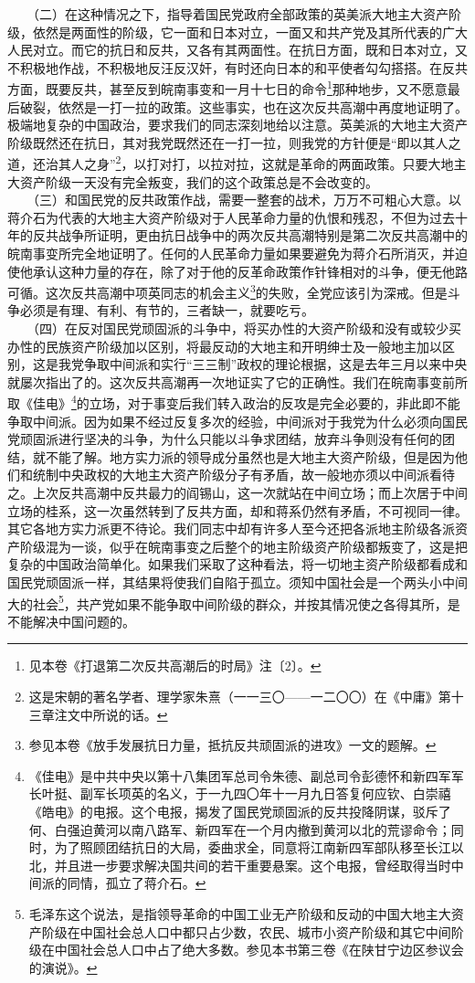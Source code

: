 \documentclass[cn,11pt,chinese]{elegantbook}
\begin{document}
　　（二）在这种情况之下，指导着国民党政府全部政策的英美派大地主大资产阶级，依然是两面性的阶级，它一面和日本对立，一面又和共产党及其所代表的广大人民对立。而它的抗日和反共，又各有其两面性。在抗日方面，既和日本对立，又不积极地作战，不积极地反汪反汉奸，有时还向日本的和平使者勾勾搭搭。在反共方面，既要反共，甚至反到皖南事变和一月十七日的命令\footnote[5]{ 见本卷《打退第二次反共高潮后的时局》注〔2〕。}那种地步，又不愿意最后破裂，依然是一打一拉的政策。这些事实，也在这次反共高潮中再度地证明了。极端地复杂的中国政治，要求我们的同志深刻地给以注意。英美派的大地主大资产阶级既然还在抗日，其对我党既然还在一打一拉，则我党的方针便是“即以其人之道，还治其人之身”\footnote[6]{ 这是宋朝的著名学者、理学家朱熹（一一三〇——一二〇〇）在《中庸》第十三章注文中所说的话。}，以打对打，以拉对拉，这就是革命的两面政策。只要大地主大资产阶级一天没有完全叛变，我们的这个政策总是不会改变的。\\
　　（三）和国民党的反共政策作战，需要一整套的战术，万万不可粗心大意。以蒋介石为代表的大地主大资产阶级对于人民革命力量的仇恨和残忍，不但为过去十年的反共战争所证明，更由抗日战争中的两次反共高潮特别是第二次反共高潮中的皖南事变所完全地证明了。任何的人民革命力量如果要避免为蒋介石所消灭，并迫使他承认这种力量的存在，除了对于他的反革命政策作针锋相对的斗争，便无他路可循。这次反共高潮中项英同志的机会主义\footnote[7]{ 参见本卷《放手发展抗日力量，抵抗反共顽固派的进攻》一文的题解。}的失败，全党应该引为深戒。但是斗争必须是有理、有利、有节的，三者缺一，就要吃亏。\\
　　（四）在反对国民党顽固派的斗争中，将买办性的大资产阶级和没有或较少买办性的民族资产阶级加以区别，将最反动的大地主和开明绅士及一般地主加以区别，这是我党争取中间派和实行“三三制”政权的理论根据，这是去年三月以来中央就屡次指出了的。这次反共高潮再一次地证实了它的正确性。我们在皖南事变前所取《佳电》\footnote[8]{ 《佳电》是中共中央以第十八集团军总司令朱德、副总司令彭德怀和新四军军长叶挺、副军长项英的名义，于一九四〇年十一月九日答复何应钦、白崇禧《皓电》的电报。这个电报，揭发了国民党顽固派的反共投降阴谋，驳斥了何、白强迫黄河以南八路军、新四军在一个月内撤到黄河以北的荒谬命令；同时，为了照顾团结抗日的大局，委曲求全，同意将江南新四军部队移至长江以北，并且进一步要求解决国共间的若干重要悬案。这个电报，曾经取得当时中间派的同情，孤立了蒋介石。}的立场，对于事变后我们转入政治的反攻是完全必要的，非此即不能争取中间派。因为如果不经过反复多次的经验，中间派对于我党为什么必须向国民党顽固派进行坚决的斗争，为什么只能以斗争求团结，放弃斗争则没有任何的团结，就不能了解。地方实力派的领导成分虽然也是大地主大资产阶级，但是因为他们和统制中央政权的大地主大资产阶级分子有矛盾，故一般地亦须以中间派看待之。上次反共高潮中反共最力的阎锡山，这一次就站在中间立场；而上次居于中间立场的桂系，这一次虽然转到了反共方面，却和蒋系仍然有矛盾，不可视同一律。其它各地方实力派更不待论。我们同志中却有许多人至今还把各派地主阶级各派资产阶级混为一谈，似乎在皖南事变之后整个的地主阶级资产阶级都叛变了，这是把复杂的中国政治简单化。如果我们采取了这种看法，将一切地主资产阶级都看成和国民党顽固派一样，其结果将使我们自陷于孤立。须知中国社会是一个两头小中间大的社会\footnote[9]{ 毛泽东这个说法，是指领导革命的中国工业无产阶级和反动的中国大地主大资产阶级在中国社会总人口中都只占少数，农民、城市小资产阶级和其它中间阶级在中国社会总人口中占了绝大多数。参见本书第三卷《在陕甘宁边区参议会的演说》。}，共产党如果不能争取中间阶级的群众，并按其情况使之各得其所，是不能解决中国问题的。\\
\end{document}
